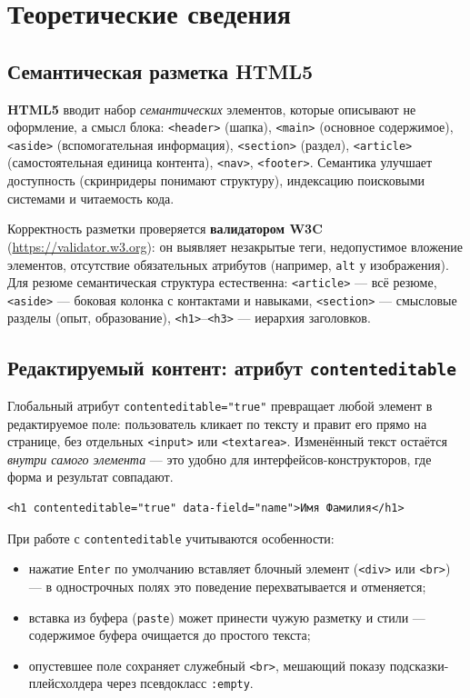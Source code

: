 \chapter{Теоретические сведения}
\label{ch:theory}

\section{Семантическая разметка HTML5}

\textbf{HTML5} вводит набор \textit{семантических} элементов, которые
описывают не оформление, а смысл блока: \texttt{<header>} (шапка),
\texttt{<main>} (основное содержимое), \texttt{<aside>} (вспомогательная
информация), \texttt{<section>} (раздел), \texttt{<article>} (самостоятельная
единица контента), \texttt{<nav>}, \texttt{<footer>}. Семантика улучшает
доступность (скринридеры понимают структуру), индексацию поисковыми
системами и читаемость кода.

Корректность разметки проверяется \textbf{валидатором W3C}
(\url{https://validator.w3.org}): он выявляет незакрытые теги, недопустимое
вложение элементов, отсутствие обязательных атрибутов (например,
\texttt{alt} у изображения). Для резюме семантическая структура естественна:
\texttt{<article>} --- всё резюме, \texttt{<aside>} --- боковая колонка с
контактами и навыками, \texttt{<section>} --- смысловые разделы (опыт,
образование), \texttt{<h1>}--\texttt{<h3>} --- иерархия заголовков.

\section{Редактируемый контент: атрибут \texttt{contenteditable}}

Глобальный атрибут \texttt{contenteditable="true"} превращает любой элемент в
редактируемое поле: пользователь кликает по тексту и правит его прямо на
странице, без отдельных \texttt{<input>} или \texttt{<textarea>}. Изменённый
текст остаётся \textit{внутри самого элемента} --- это удобно для
интерфейсов-конструкторов, где форма и результат совпадают.

\begin{lstlisting}[caption={Редактируемый элемент},captionpos=b]
<h1 contenteditable="true" data-field="name">Имя Фамилия</h1>
\end{lstlisting}

При работе с \texttt{contenteditable} учитываются особенности:
\begin{itemize}
  \item нажатие \texttt{Enter} по умолчанию вставляет блочный элемент
        (\texttt{<div>} или \texttt{<br>}) --- в однострочных полях это
        поведение перехватывается и отменяется;
  \item вставка из буфера (\texttt{paste}) может принести чужую разметку и
        стили --- содержимое буфера очищается до простого текста;
  \item опустевшее поле сохраняет служебный \texttt{<br>}, мешающий показу
        подсказки-плейсхолдера через псевдокласс \texttt{:empty}.
\end{itemize}

